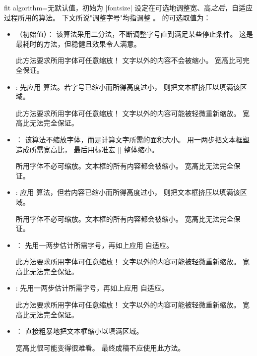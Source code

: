 \clearpage
\begin{docTcbKey}{fit algorithm}{=}{无默认值，初始为 |fontsize|}
设定在可选地调整宽、高\emph{之后}，自适应过程所用的算法。
下文所说"调整字号"均指调整 。
   的可选取值为：
  \begin{itemize}
  \item{}（初始值）：
    该算法采用二分法，不断调整字号直到满足某些停止条件。
    这是最耗时的方法，但稳健且效果令人满意。
    \begin{marker}
    此方法要求所用字体可任意缩放！
    文字以外的内容不会被缩小。
    宽高比可完全保证。
    \end{marker}
  \item{}:
    先应用  算法。若字号已缩小而所得高度过小，
    则把文本框挤压以填满该区域。
    \begin{marker}
    此方法要求所用字体可任意缩放！
    文字以外的内容可能被轻微重新缩放。
    宽高比无法完全保证。
    \end{marker}
  \item{}：
    该算法不缩放字体，而是计算文字所需的面积大小。
    用一两步把文本框塑造成所需宽高比，
    最后用标准宏 |\resizebox| 整体缩小。
    \begin{marker}
    所用字体不必可缩放。文本框的所有内容都会被缩小。
    宽高比无法完全保证。
    \end{marker}
  \item{}:
    应用  算法，但若内容已缩小而所得高度过小，
    则把文本框挤压以填满该区域。
    \begin{marker}
    所用字体不必可缩放。文本框的所有内容都会被缩小。
    宽高比无法完全保证。
    \end{marker}
  \item{}：
    先用一两步估计所需字号，再如上应用  自适应。
    \begin{marker}
    此方法要求所用字体可任意缩放！
    文字以外的内容可能被轻微重新缩放。
    宽高比无法完全保证。
    \end{marker}
  \item{}:
    先用一两步估计所需字号，再如上应用  自适应。
    \begin{marker}
    此方法要求所用字体可任意缩放！
    文字以外的内容可能被轻微重新缩放。
    宽高比无法完全保证。
    \end{marker}
  \item{}：
    直接粗暴地把文本框缩小以填满区域。
    \begin{marker}
    宽高比很可能变得很难看。
    最终成稿不应使用此方法。
    \end{marker}
\end{itemize}


\end{docTcbKey}
